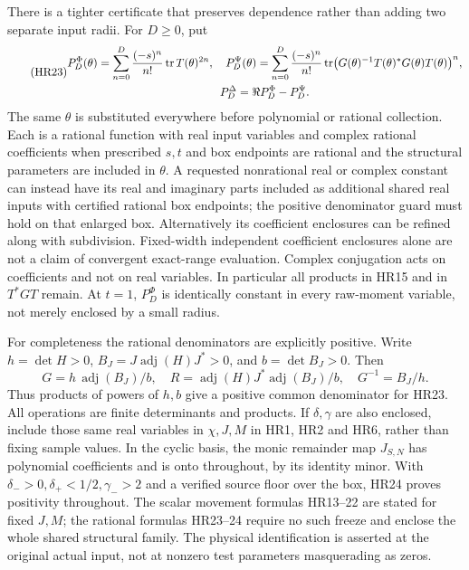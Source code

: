 There is a tighter certificate that preserves dependence rather than
adding two separate input radii. For \(D\ge0\), put
\begin{equation}\tag{HR23}\label{hrv:HR23}
\begin{gathered}
P_D^\Phi(\theta)=\sum_{n=0}^D\frac{(-s)^n}{n!}\operatorname{tr} T(\theta)^{2n},\quad
P_D^\Psi(\theta)=\sum_{n=0}^D\frac{(-s)^n}{n!}
\operatorname{tr}\bigl(G(\theta)^{-1}T(\theta)^*G(\theta)T(\theta)\bigr)^n,\\
P_D^\Delta=\Re P_D^\Phi-P_D^\Psi.
\end{gathered}
\end{equation}
The same \(\theta\) is substituted everywhere before polynomial or
rational collection. Each is a rational function with real input
variables and complex rational coefficients when prescribed
\(s,t\) and box endpoints are rational and the structural parameters
are included in \(\theta\). A requested nonrational real or complex
constant can instead have its real and imaginary parts included as
additional shared real inputs with certified rational box endpoints;
the positive denominator guard must hold on that enlarged box.
Alternatively its coefficient enclosures can be refined along with
subdivision. Fixed-width independent coefficient enclosures alone are
not a claim of convergent exact-range evaluation. Complex conjugation acts on
coefficients and not on real variables. In particular all products
in HR15 and in \(T^*GT\) remain. At \(t=1\), \(P_D^\Phi\) is
identically constant in every raw-moment variable, not merely enclosed
by a small radius.

For completeness the rational denominators are explicitly positive.
Write \(h=\det H>0\), \(B_J=J\operatorname{adj}(H)J^*>0\), and
\(b=\det B_J>0\). Then
\begin{equation}\tag{HR24}\label{hrv:HR24}
G=h\,\operatorname{adj}(B_J)/b,\quad
R=\operatorname{adj}(H)J^*\operatorname{adj}(B_J)/b,\quad
G^{-1}=B_J/h.
\end{equation}
Thus products of powers of \(h,b\) give a positive common denominator
for HR23. All operations are finite determinants and products.
If \(\delta,\gamma\) are also enclosed, include those same real
variables in \(\chi,J,M\) in HR1, HR2 and HR6, rather than fixing
sample values. In the cyclic basis, the monic remainder map \(J_{S,N}\)
has polynomial coefficients and is onto throughout, by its identity
minor. With \(\delta_->0,\delta_+<1/2,\gamma_->2\) and a verified
source floor over the box, HR24 proves positivity throughout.
The scalar movement formulas HR13--22 are stated for fixed \(J,M\);
the rational formulas HR23--24 require no such freeze and enclose the
whole shared structural family. The physical identification is asserted
at the original actual input, not at nonzero test parameters masquerading
as zeros.

